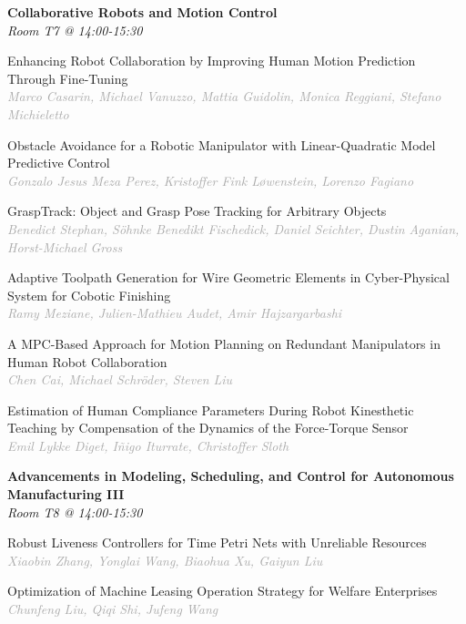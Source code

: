 \begin{multicols*}{2}
\normalsize \textbf{Collaborative Robots and Motion Control}\\
\small \textit{Room T7 @ 14:00-15:30}

\small Enhancing Robot Collaboration by Improving Human Motion Prediction Through Fine-Tuning\\ 
\footnotesize \textcolor{darkgray}{\textit{Marco Casarin, Michael  Vanuzzo, Mattia  Guidolin, Monica  Reggiani, Stefano  Michieletto}}

\small Obstacle Avoidance for a Robotic Manipulator with Linear-Quadratic Model Predictive Control\\ 
\footnotesize \textcolor{darkgray}{\textit{Gonzalo Jesus Meza Perez, Kristoffer Fink  Løwenstein, Lorenzo  Fagiano}}

\small GraspTrack: Object and Grasp Pose Tracking for Arbitrary Objects\\ 
\footnotesize \textcolor{darkgray}{\textit{Benedict Stephan, Söhnke Benedikt  Fischedick, Daniel  Seichter, Dustin  Aganian, Horst-Michael  Gross}}

\small Adaptive Toolpath Generation for Wire Geometric Elements in Cyber-Physical System for Cobotic Finishing\\ 
\footnotesize \textcolor{darkgray}{\textit{Ramy Meziane, Julien-Mathieu  Audet, Amir  Hajzargarbashi}}

\small A MPC-Based Approach for Motion Planning on Redundant Manipulators in Human Robot Collaboration\\ 
\footnotesize \textcolor{darkgray}{\textit{Chen Cai, Michael  Schröder, Steven  Liu}}

\small Estimation of Human Compliance Parameters During Robot Kinesthetic Teaching by Compensation of the Dynamics of the Force-Torque Sensor\\ 
\footnotesize \textcolor{darkgray}{\textit{Emil Lykke Diget, Iñigo  Iturrate, Christoffer  Sloth}}

\normalsize \textbf{Advancements in Modeling, Scheduling, and Control for Autonomous Manufacturing III}\\
\small \textit{Room T8 @ 14:00-15:30}

\small Robust Liveness Controllers for Time Petri Nets with Unreliable Resources\\ 
\footnotesize \textcolor{darkgray}{\textit{Xiaobin Zhang, Yonglai  Wang, Biaohua  Xu, Gaiyun  Liu}}

\small Optimization of Machine Leasing Operation Strategy for Welfare Enterprises\\ 
\footnotesize \textcolor{darkgray}{\textit{Chunfeng Liu, Qiqi  Shi, Jufeng  Wang}}


\end{multicols*}
